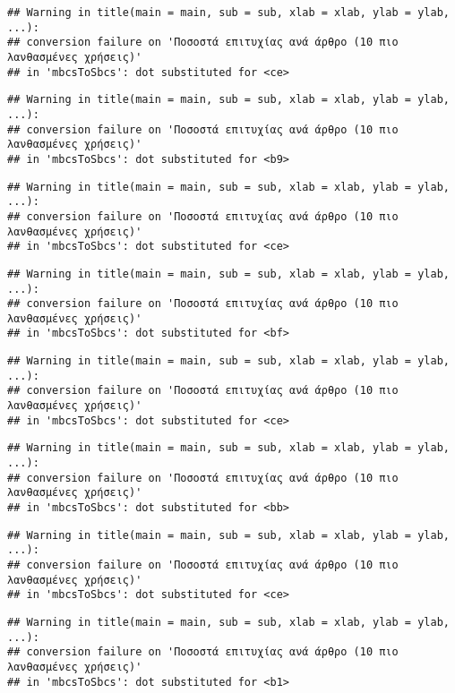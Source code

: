 \documentclass[
]{article}
\begin{document}
\begin{verbatim}
## Warning in title(main = main, sub = sub, xlab = xlab, ylab = ylab, ...):
## conversion failure on 'Ποσοστά επιτυχίας ανά άρθρο (10 πιο λανθασμένες χρήσεις)'
## in 'mbcsToSbcs': dot substituted for <ce>
\end{verbatim}

\begin{verbatim}
## Warning in title(main = main, sub = sub, xlab = xlab, ylab = ylab, ...):
## conversion failure on 'Ποσοστά επιτυχίας ανά άρθρο (10 πιο λανθασμένες χρήσεις)'
## in 'mbcsToSbcs': dot substituted for <b9>
\end{verbatim}

\begin{verbatim}
## Warning in title(main = main, sub = sub, xlab = xlab, ylab = ylab, ...):
## conversion failure on 'Ποσοστά επιτυχίας ανά άρθρο (10 πιο λανθασμένες χρήσεις)'
## in 'mbcsToSbcs': dot substituted for <ce>
\end{verbatim}

\begin{verbatim}
## Warning in title(main = main, sub = sub, xlab = xlab, ylab = ylab, ...):
## conversion failure on 'Ποσοστά επιτυχίας ανά άρθρο (10 πιο λανθασμένες χρήσεις)'
## in 'mbcsToSbcs': dot substituted for <bf>
\end{verbatim}

\begin{verbatim}
## Warning in title(main = main, sub = sub, xlab = xlab, ylab = ylab, ...):
## conversion failure on 'Ποσοστά επιτυχίας ανά άρθρο (10 πιο λανθασμένες χρήσεις)'
## in 'mbcsToSbcs': dot substituted for <ce>
\end{verbatim}

\begin{verbatim}
## Warning in title(main = main, sub = sub, xlab = xlab, ylab = ylab, ...):
## conversion failure on 'Ποσοστά επιτυχίας ανά άρθρο (10 πιο λανθασμένες χρήσεις)'
## in 'mbcsToSbcs': dot substituted for <bb>
\end{verbatim}

\begin{verbatim}
## Warning in title(main = main, sub = sub, xlab = xlab, ylab = ylab, ...):
## conversion failure on 'Ποσοστά επιτυχίας ανά άρθρο (10 πιο λανθασμένες χρήσεις)'
## in 'mbcsToSbcs': dot substituted for <ce>
\end{verbatim}

\begin{verbatim}
## Warning in title(main = main, sub = sub, xlab = xlab, ylab = ylab, ...):
## conversion failure on 'Ποσοστά επιτυχίας ανά άρθρο (10 πιο λανθασμένες χρήσεις)'
## in 'mbcsToSbcs': dot substituted for <b1>
\end{verbatim}
\end{document}
